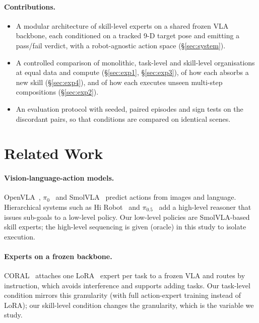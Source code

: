 \documentclass[conference]{IEEEtran}
\begin{document}
\paragraph{Contributions.}
\begin{itemize}
\item A modular architecture of skill-level experts on a shared frozen VLA backbone, each conditioned on a tracked
  9-D target pose and emitting a pass/fail verdict, with a robot-agnostic action space (\S\ref{sec:system}).
\item A controlled comparison of monolithic, task-level and skill-level organisations at equal data and compute
  (\S\ref{sec:exp1}, \S\ref{sec:exp3}), of how each absorbs a new skill (\S\ref{sec:exp4}), and of how each executes
  unseen multi-step compositions (\S\ref{sec:exp2}).
\item An evaluation protocol with seeded, paired episodes and sign tests on the discordant pairs, so that
  conditions are compared on identical scenes.
\end{itemize}

\section{Related Work}
\paragraph{Vision-language-action models.}
OpenVLA~\cite{kim2024openvla}, $\pi_0$~\cite{black2024pi0} and SmolVLA~\cite{shukor2025smolvla} predict actions
from images and language. Hierarchical systems such as Hi Robot~\cite{shi2025hirobot} and
$\pi_{0.5}$~\cite{intelligence2025pi05} add a high-level reasoner that issues sub-goals to a low-level policy. Our
low-level policies are SmolVLA-based skill experts; the high-level sequencing is given (oracle) in this study to
isolate execution.

\paragraph{Experts on a frozen backbone.}
CORAL~\cite{luo2026coral} attaches one LoRA~\cite{hu2022lora} expert per task to a frozen VLA and routes by
instruction, which avoids interference and supports adding tasks. Our task-level condition mirrors this
granularity (with full action-expert training instead of LoRA); our skill-level condition changes the granularity,
which is the variable we study.
\end{document}

